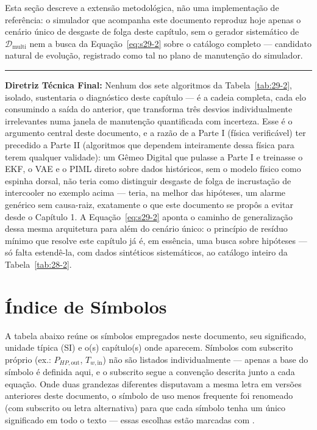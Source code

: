 \documentclass[12pt,a4paper]{article}
\numberwithin{equation}{section}
\numberwithin{table}{section}
\numberwithin{figure}{section}
\begin{document}
Esta seção descreve a extensão metodológica, não uma implementação de referência: o simulador que acompanha este documento reproduz hoje apenas o cenário único de desgaste de folga deste capítulo, sem o gerador sistemático de $\mathcal{D}_{\text{multi}}$ nem a busca da Equação~\eqref{eq:s29-2} sobre o catálogo completo — candidato natural de evolução, registrado como tal no plano de manutenção do simulador.

\vspace{1em}
\hrule
\vspace{1em}

\textbf{Diretriz Técnica Final:} Nenhum dos sete algoritmos da Tabela~\ref{tab:29-2}, isolado, sustentaria o diagnóstico deste capítulo — é a cadeia completa, cada elo consumindo a saída do anterior, que transforma três desvios individualmente irrelevantes numa janela de manutenção quantificada com incerteza. Esse é o argumento central deste documento, e a razão de a Parte I (física verificável) ter precedido a Parte II (algoritmos que dependem inteiramente dessa física para terem qualquer validade): um Gêmeo Digital que pulasse a Parte I e treinasse o EKF, o VAE e o PIML direto sobre dados históricos, sem o modelo físico como espinha dorsal, não teria como distinguir desgaste de folga de incrustação de intercooler no exemplo acima — teria, na melhor das hipóteses, um alarme genérico sem causa-raiz, exatamente o que este documento se propôs a evitar desde o Capítulo 1. A Equação~\eqref{eq:s29-2} aponta o caminho de generalização dessa mesma arquitetura para além do cenário único: o princípio de resíduo mínimo que resolve este capítulo já é, em essência, uma busca sobre hipóteses — só falta estendê-la, com dados sintéticos sistemáticos, ao catálogo inteiro da Tabela~\ref{tab:28-2}.

\clearpage
\section*{Índice de Símbolos}

A tabela abaixo reúne os símbolos empregados neste documento, seu significado, unidade típica (SI) e o(s) capítulo(s) onde aparecem. Símbolos com subscrito próprio (ex.: $P_{HP,\text{out}}$, $T_{w,\text{in}}$) não são listados individualmente — apenas a base do símbolo é definida aqui, e o subscrito segue a convenção descrita junto a cada equação. Onde duas grandezas diferentes disputavam a mesma letra em versões anteriores deste documento, o símbolo de uso menos frequente foi renomeado (com subscrito ou letra alternativa) para que cada símbolo tenha um único significado em todo o texto — essas escolhas estão marcadas com \dag.
\end{document}
